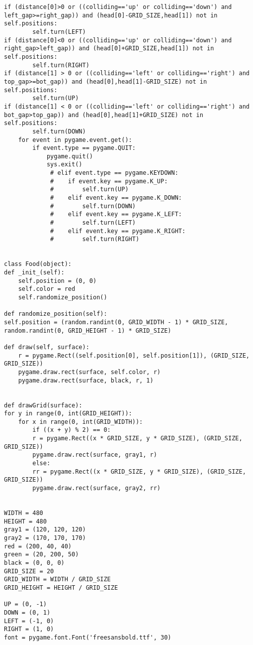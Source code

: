 \documentclass[a4paper,12pt]{report}
\begin{document}
\begin{verbatim}
if (distance[0]>0 or ((colliding=='up' or colliding=='down') and 
left_gap>=right_gap)) and (head[0]-GRID_SIZE,head[1]) not in self.positions:
        self.turn(LEFT)
if (distance[0]<0 or ((colliding=='up' or colliding=='down') and 
right_gap>left_gap)) and (head[0]+GRID_SIZE,head[1]) not in self.positions:
        self.turn(RIGHT)
if (distance[1] > 0 or ((colliding=='left' or colliding=='right') and 
top_gap>=bot_gap)) and (head[0],head[1]-GRID_SIZE) not in self.positions:
        self.turn(UP)
if (distance[1] < 0 or ((colliding=='left' or colliding=='right') and 
bot_gap>top_gap)) and (head[0],head[1]+GRID_SIZE) not in self.positions:
        self.turn(DOWN)
    for event in pygame.event.get():
        if event.type == pygame.QUIT:
            pygame.quit()
            sys.exit()
             # elif event.type == pygame.KEYDOWN:
             #    if event.key == pygame.K_UP:
             #        self.turn(UP)
             #    elif event.key == pygame.K_DOWN:
             #        self.turn(DOWN)
             #    elif event.key == pygame.K_LEFT:
             #        self.turn(LEFT)
             #    elif event.key == pygame.K_RIGHT:
             #        self.turn(RIGHT)


class Food(object):
def _init_(self):
    self.position = (0, 0)
    self.color = red
    self.randomize_position()

def randomize_position(self):
self.position = (random.randint(0, GRID_WIDTH - 1) * GRID_SIZE, 
random.randint(0, GRID_HEIGHT - 1) * GRID_SIZE)

def draw(self, surface):
    r = pygame.Rect((self.position[0], self.position[1]), (GRID_SIZE, GRID_SIZE))
    pygame.draw.rect(surface, self.color, r)
    pygame.draw.rect(surface, black, r, 1)


def drawGrid(surface):
for y in range(0, int(GRID_HEIGHT)):
    for x in range(0, int(GRID_WIDTH)):
        if ((x + y) % 2) == 0:
        r = pygame.Rect((x * GRID_SIZE, y * GRID_SIZE), (GRID_SIZE, GRID_SIZE))
        pygame.draw.rect(surface, gray1, r)
        else:
        rr = pygame.Rect((x * GRID_SIZE, y * GRID_SIZE), (GRID_SIZE, GRID_SIZE))
        pygame.draw.rect(surface, gray2, rr)


WIDTH = 480
HEIGHT = 480
gray1 = (120, 120, 120)
gray2 = (170, 170, 170)
red = (200, 40, 40)
green = (20, 200, 50)
black = (0, 0, 0)
GRID_SIZE = 20
GRID_WIDTH = WIDTH / GRID_SIZE
GRID_HEIGHT = HEIGHT / GRID_SIZE

UP = (0, -1)
DOWN = (0, 1)
LEFT = (-1, 0)
RIGHT = (1, 0)
font = pygame.font.Font('freesansbold.ttf', 30)



\end{verbatim}
\end{document}
